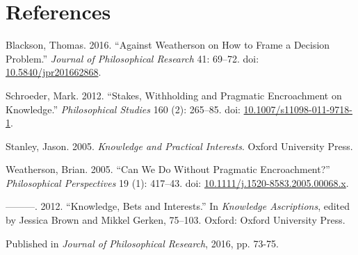 \documentclass[
  11pt,
  letterpaper,
  DIV=11,
  numbers=noendperiod,
  twoside]{scrartcl}
\newlength{\cslhangindent}
\newenvironment{CSLReferences}[2] %
 {\begin{list}{}{%
  \setlength{\itemindent}{0pt}
  \setlength{\leftmargin}{0pt}
  \setlength{\parsep}{0pt}
  \ifodd #1
   \setlength{\leftmargin}{\cslhangindent}
   \setlength{\itemindent}{-1\cslhangindent}
  \fi
  \setlength{\itemsep}{#2\baselineskip}}}
 {\end{list}}
\begin{document}
\section*{References}\label{references}

\label{refs}
\begin{CSLReferences}{1}{0}
Blackson, Thomas. 2016. {``Against Weatherson on How to Frame a Decision
Problem.''} \emph{Journal of Philosophical Research} 41: 69--72. doi:
\href{https://doi.org/10.5840/jpr201662868}{10.5840/jpr201662868}.

Schroeder, Mark. 2012. {``Stakes, Withholding and Pragmatic Encroachment
on Knowledge.''} \emph{Philosophical Studies} 160 (2): 265--85. doi:
\href{https://doi.org/10.1007/s11098-011-9718-1}{10.1007/s11098-011-9718-1}.

Stanley, Jason. 2005. \emph{{Knowledge and Practical Interests}}. Oxford
University Press.

Weatherson, Brian. 2005. {``{Can We Do Without Pragmatic
Encroachment?}''} \emph{Philosophical Perspectives} 19 (1): 417--43.
doi:
\href{https://doi.org/10.1111/j.1520-8583.2005.00068.x}{10.1111/j.1520-8583.2005.00068.x}.

---------. 2012. {``Knowledge, Bets and Interests.''} In \emph{Knowledge
Ascriptions}, edited by Jessica Brown and Mikkel Gerken, 75--103.
Oxford: Oxford University Press.

\end{CSLReferences}



\noindent Published in\emph{
Journal of Philosophical Research}, 2016, pp. 73-75.
\end{document}
